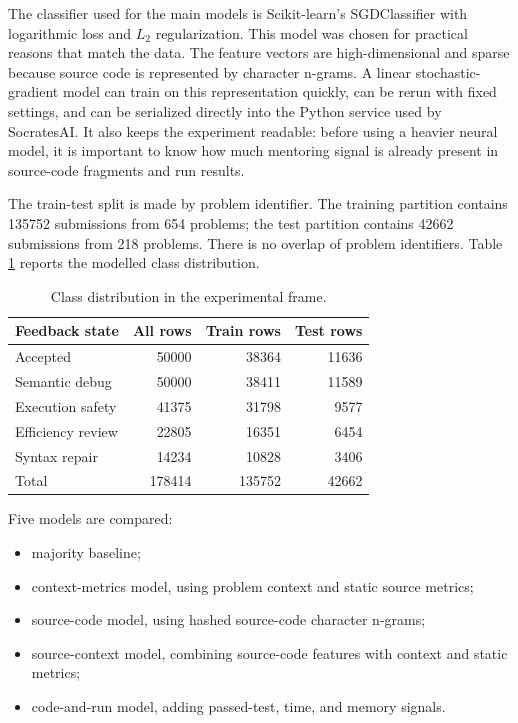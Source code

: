 \documentclass[twoside,11pt]{article}
\begin{document}
The classifier used for the main models is Scikit-learn's \hbox{SGDClassifier} with logarithmic loss and $L_2$ regularization. This model was chosen for practical reasons that match the data. The feature vectors are high-dimensional and sparse because source code is represented by character n-grams. A linear stochastic-gradient model can train on this representation quickly, can be rerun with fixed settings, and can be serialized directly into the Python service used by SocratesAI. It also keeps the experiment readable: before using a heavier neural model, it is important to know how much mentoring signal is already present in source-code fragments and run results.

The train-test split is made by problem identifier. The training partition contains 135752 submissions from 654 problems; the test partition contains 42662 submissions from 218 problems. There is no overlap of problem identifiers. Table \ref{tab:distribution} reports the modelled class distribution.

\begin{table}[H]
\centering
\small
\caption{Class distribution in the experimental frame.}
\label{tab:distribution}
\begin{tabular}{|l|r|r|r|}
\hline
{\bf Feedback state} & {\bf All rows} & {\bf Train rows} & {\bf Test rows} \\
\hline
Accepted & 50000 & 38364 & 11636 \\
Semantic debug & 50000 & 38411 & 11589 \\
Execution safety & 41375 & 31798 & 9577 \\
Efficiency review & 22805 & 16351 & 6454 \\
Syntax repair & 14234 & 10828 & 3406 \\
\hline
Total & 178414 & 135752 & 42662 \\
\hline
\end{tabular}
\end{table}

Five models are compared:
\begin{itemize}
\item majority baseline;
\item context-metrics model, using problem context and static source metrics;
\item source-code model, using hashed source-code character n-grams;
\item source-context model, combining source-code features with context and static metrics;
\item code-and-run model, adding passed-test, time, and memory signals.
\end{itemize}
\end{document}
